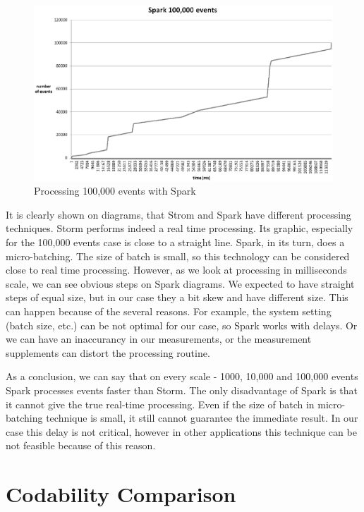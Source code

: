 \begin{figure}
  \centering
  \includegraphics [width=1.1\textwidth]{images/spark100000}
  \caption{Processing 100,000 events with Spark}
  \label{fig:spark100000}
\end{figure}

It is clearly shown on diagrams, that Strom and Spark have different processing techniques.
Storm performs indeed a real time processing.
Its graphic, especially for the 100,000 events case is close to a straight line.
Spark, in its turn, does a micro-batching.
The size of batch is small, so this technology can be considered close to real time processing.
However, as we look at processing in milliseconds scale, we can see obvious steps on Spark diagrams. 
We expected to have straight steps of equal size, but in our case they a bit skew and have different size.
This can happen because of the several reasons.
For example, the system setting (batch size, etc.) can be not optimal for our case, so Spark works with delays.
Or we can have an inaccurancy in our measurements, or the measurement supplements can distort the processing routine.    

As a conclusion, we can say that on every scale - 1000, 10,000 and 100,000 events Spark processes events faster than Storm.
The only disadvantage of Spark is that it cannot give the true real-time processing.
Even if the size of batch in micro-batching technique is small, it still cannot guarantee the immediate result.
In our case this delay is not critical, however in other applications this technique can be not feasible because of this reason.  

\section{Codability Comparison}

